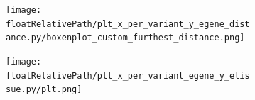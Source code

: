 \begin{figure}[!ht]
    \centering
    \begin{subfigure}[]{.49\textwidth}
        \texttt{[image: \\floatRelativePath/plt\_x\_per\_variant\_y\_egene\_distance.py/boxenplot\_custom\_furthest\_distance.png]}
    \end{subfigure}

    \caption{}

\end{figure}


\begin{figure}[!ht]
    \centering
    \begin{subfigure}[]{.49\textwidth}
        \texttt{[image: \\floatRelativePath/plt\_x\_per\_variant\_egene\_y\_etissue.py/plt.png]}
    \end{subfigure}

    \caption{}

\end{figure}



